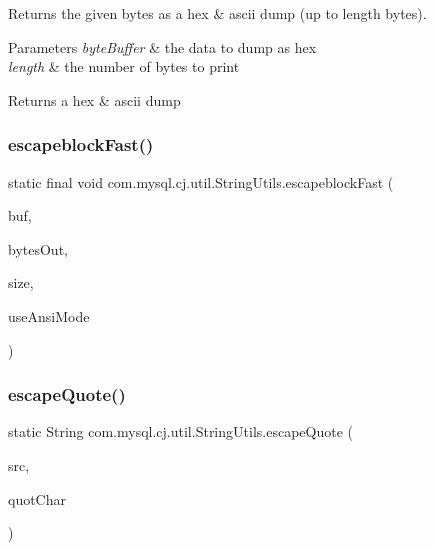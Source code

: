 Returns the given bytes as a hex \& ascii dump (up to length bytes).


\begin{DoxyParams}{Parameters}
{\em byte\+Buffer} & the data to dump as hex \\
\hline
{\em length} & the number of bytes to print\\
\hline
\end{DoxyParams}
\begin{DoxyReturn}{Returns}
a hex \& ascii dump 
\end{DoxyReturn}
\mbox{\label{classcom_1_1mysql_1_1cj_1_1util_1_1_string_utils_ad76be718917db8d91c0f77e545fb4651}} 
\subsubsection{\texorpdfstring{escapeblock\+Fast()}{escapeblockFast()}}
{\footnotesize\ttfamily static final void com.\+mysql.\+cj.\+util.\+String\+Utils.\+escapeblock\+Fast (\begin{DoxyParamCaption}\item[{byte \mbox{[}$\,$\mbox{]}}]{buf,  }\item[{Byte\+Array\+Output\+Stream}]{bytes\+Out,  }\item[{int}]{size,  }\item[{boolean}]{use\+Ansi\+Mode }\end{DoxyParamCaption})\hspace{0.3cm}{\ttfamily [static]}}

\mbox{\label{classcom_1_1mysql_1_1cj_1_1util_1_1_string_utils_af537620e8a64cf0e1ca40676ca3304bc}} 
\subsubsection{\texorpdfstring{escape\+Quote()}{escapeQuote()}}
{\footnotesize\ttfamily static String com.\+mysql.\+cj.\+util.\+String\+Utils.\+escape\+Quote (\begin{DoxyParamCaption}\item[{String}]{src,  }\item[{String}]{quot\+Char }\end{DoxyParamCaption})\hspace{0.3cm}{\ttfamily [static]}}

